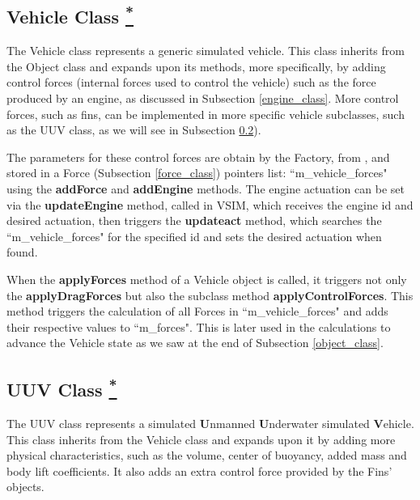\documentclass[10pt,a4paper]{article}
\begin{document}
\subsection{Vehicle Class \href{https://www.lsts.pt/docs/dune/dune-2017.01.0-dmsmw/d4/d43/classSimulators_1_1VSIM_1_1Vehicle.html}{\textsuperscript{*}}}
\label{vehicle_class}

\par The Vehicle class represents a generic simulated vehicle. This class inherits from the Object class and expands upon its methods, more specifically, by adding control forces (internal forces used to control the vehicle) such as the force produced by an engine, as discussed in Subsection \ref{engine_class}. More control forces, such as fins, can be implemented in more specific vehicle subclasses, such as the UUV class, as we will see in Subsection \ref{uuv_class}). 

\par The parameters for these control forces are obtain by the Factory, from , and stored in a Force (Subsection \ref{force_class}) pointers list: ``m\_vehicle\_forces" using the \textbf{addForce} and \textbf{addEngine} methods. The engine actuation can be set via the \textbf{updateEngine} method, called in VSIM, which receives the engine id and desired actuation, then triggers the \textbf{updateact} method, which searches the ``m\_vehicle\_forces" for the specified id and sets the desired actuation when found.

\par When the \textbf{applyForces} method of a Vehicle object is called, it triggers not only the \textbf{applyDragForces} but also the subclass method \textbf{applyControlForces}. This method triggers the calculation of all Forces in ``m\_vehicle\_forces" and adds their respective values to ``m\_forces". This is later used in the calculations to advance the Vehicle state as we saw at the end of Subsection \ref{object_class}.

\subsection{UUV Class \href{https://www.lsts.pt/docs/dune/dune-2017.01.0-dmsmw/d1/d3b/classSimulators_1_1VSIM_1_1UUV.html}{\textsuperscript{*}}}
\label{uuv_class}

\par The UUV class represents a simulated \textbf{U}nmanned \textbf{U}nderwater simulated \textbf{V}ehicle. This class inherits from the Vehicle class and expands upon it by adding more physical characteristics, such as the volume, center of buoyancy, added mass and body lift coefficients. It also adds an extra control force provided by the Fins' objects.
\end{document}
